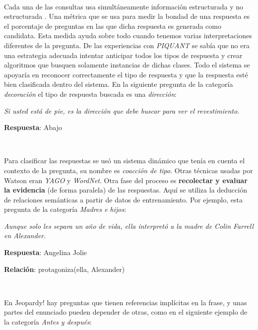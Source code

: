 \documentclass[paper=a4, fontsize=10pt]{scrartcl} %
\numberwithin{equation}{section} %
\numberwithin{figure}{section} %
\numberwithin{table}{section} %
\begin{document}
\

Cada una de las consultas usa simultáneamente información estructurada y no estructurada .
Una métrica %
que se usa para medir la bondad de una respuesta es el porcentaje de preguntas en las que dicha respuesta es generada como candidata. 
Esta medida ayuda sobre todo cuando tenemos varias interpretaciones diferentes de la pregunta.
De las experiencias con \textit{PIQUANT} se sabía que no era una estrategia adecuada intentar anticipar todos los tipos de respuesta y crear algoritmos que busquen solamente instancias de dichas clases.
Todo el sistema se apoyaría en reconocer correctamente el tipo de respuesta y que la respuesta esté bien clasificada dentro del sistema.
En la siguiente pregunta de la categoría \textit{decoración} el tipo de respuesta buscada es una \textit{dirección}:

\begin{center}
\textit{Si usted está de pie, es la dirección que debe buscar para ver el revestimiento.}

\textbf{Respuesta}: Abajo
\end{center}

\

Para clasificar las respuestas se usó un sistema dinámico que tenía en cuenta el contexto de la pregunta, su nombre es \textit{coacción de tipo}. %
Otras técnicas usadas por Watson eran \textit{YAGO} y \textit{WordNet}. %
Otra fase del proceso es \textbf{recolectar y evaluar la evidencia} (de forma paralela) de las respuestas. 
Aquí se utiliza la deducción de relaciones semánticas a partir de datos de entrenamiento. Por ejemplo, esta pregunta de la categoría \textit{Madres e hijos}:

\begin{center}
\textit{Aunque solo les separa un año de vida, ella interpretó a la madre de Colin Farrell en Alexander.}

\textbf{Respuesta}: Angelina Jolie

\textbf{Relación}: protagoniza(ella, Alexander)
\end{center}

\

En Jeopardy! hay preguntas que tienen referencias implícitas en la frase, y unas partes del enunciado pueden depender de otras, como en el siguiente ejemplo de la categoría \textit{Antes y después}:
\end{document}
